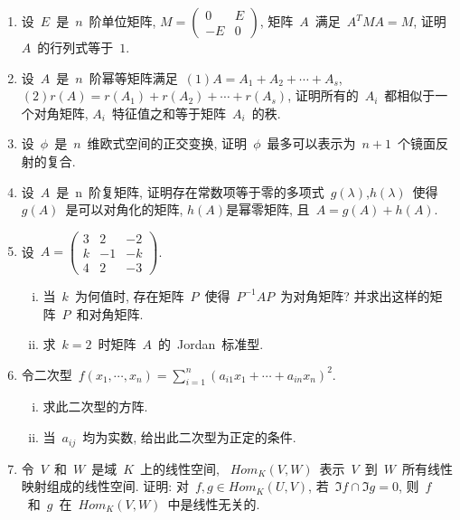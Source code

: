 \documentclass[UTF8,a4paper,11pt]{article}
\begin{document}
\begin{enumerate}
	\item 设~$E$~是~$n$~阶单位矩阵, $M=\begin{pmatrix}0 & E\\ -E & 0\end{pmatrix}$, 矩阵~$A$~满足~$A^{T}MA=M$, 证明~$A$~的行列式等于~$1$.
	      \vspace{2em}
	\item 设~$A$~是~$n$~阶幂等矩阵满足~$(1) A=A_1+A_2+\cdots+A_s$, $(2) r(A)=r(A_1)+r(A_2)+\cdots+r(A_s)$, 证明所有的~$A_i$~都相似于一个对角矩阵, $A_i$~特征值之和等于矩阵~$A_i$~的秩.
	      \vspace{2em}
	\item 设~$\phi$~是~$n$~维欧式空间的正交变换, 证明~$\phi$~最多可以表示为~$n+1$~个镜面反射的复合.
	      \vspace{2em}
	\item 设~$A$~是~n~阶复矩阵, 证明存在常数项等于零的多项式~$g(\lambda)$,$h(\lambda)$~使得~$g(A)$~是可以对角化的矩阵, $h(A)$是幂零矩阵, 且~$A=g(A)+h(A)$.
	      \vspace{2em}
	\item 设~$A=\begin{pmatrix}3 & 2 & -2\\ k & -1 & -k\\ 4 & 2 & -3\end{pmatrix}$.
	      \begin{enumerate}[(i)]
		      \item 当~$k$~为何值时, 存在矩阵~$P$~使得~$P^{-1}AP$~为对角矩阵? 并求出这样的矩阵~$P$~和对角矩阵.
		      \item 求~$k=2$~时矩阵~$A$~的~Jordan~标准型.
	      \end{enumerate}
	      \vspace{2em}
	\item 令二次型~$f(x_1,\cdots,x_n)=\sum\limits_{i=1}^{n}(a_{i1}x_1+\cdots+a_{in}x_n)^2$.
	      \begin{enumerate}[(i)]
		      \item 求此二次型的方阵.
		      \item 当~$a_{ij}$~均为实数, 给出此二次型为正定的条件.
	      \end{enumerate}
	      \vspace{2em}
	\item 令~$V$~和~$W$~是域~$K$~上的线性空间, ~$Hom_{K}(V,W)$~表示~$V$~到~$W$~所有线性映射组成的线性空间. 证明: 对~$f,g\in Hom_{K}(U,V)$, 若~$\Im f\cap \Im g=0$, 则~$f$~和~$g$~在~$Hom_K(V,W)$~中是线性无关的.

\end{enumerate}
\end{document}
